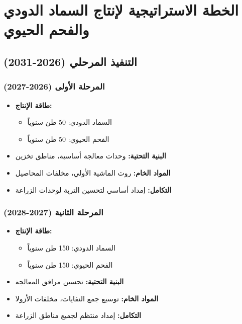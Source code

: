 \section{الخطة الاستراتيجية لإنتاج السماد الدودي والفحم الحيوي}

\subsection{التنفيذ المرحلي (2026-2031)}

\subsubsection{المرحلة الأولى (2026-2027)}
\begin{itemize}
    \item \textbf{طاقة الإنتاج:}
    \begin{itemize}
        \item السماد الدودي: 50 طن سنوياً
        \item الفحم الحيوي: 50 طن سنوياً
    \end{itemize}
    \item \textbf{البنية التحتية:} وحدات معالجة أساسية، مناطق تخزين
    \item \textbf{المواد الخام:} روث الماشية الأولي، مخلفات المحاصيل
    \item \textbf{التكامل:} إمداد أساسي لتحسين التربة لوحدات الزراعة
\end{itemize}

\subsubsection{المرحلة الثانية (2027-2028)}
\begin{itemize}
    \item \textbf{طاقة الإنتاج:}
    \begin{itemize}
        \item السماد الدودي: 150 طن سنوياً
        \item الفحم الحيوي: 150 طن سنوياً
    \end{itemize}
    \item \textbf{البنية التحتية:} تحسين مرافق المعالجة
    \item \textbf{المواد الخام:} توسيع جمع النفايات، مخلفات الأزولا
    \item \textbf{التكامل:} إمداد منتظم لجميع مناطق الزراعة
\end{itemize}

